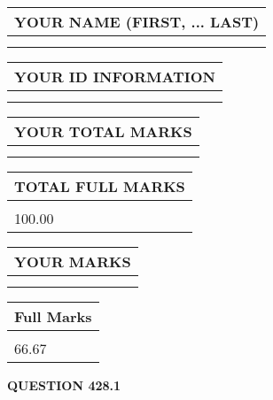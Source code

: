 \documentclass{ctexart}
\begin{document}
   
   
   
\newpage 
\setcounter{page}{ 
   428001 } 
   
   
   
   
\noindent\begin{tabular}{|l|}
\hline
YOUR NAME (FIRST, ... LAST)  \\
\hline
 \\ 
 \\ 
\hline
\end{tabular}
\hspace{0.05in} \begin{tabular}{|l|}
\hline
 YOUR   ID   INFORMATION  \\
\hline
 \\ 
 \\ 
\hline
\end{tabular}
   
   
\vspace{0.2in}\noindent\begin{tabular}{|l|}
\hline
YOUR TOTAL MARKS  \\
\hline
 \\ 
 \\ 
\hline
\end{tabular}
\hspace{0.05in} \begin{tabular}{|l|}
\hline
TOTAL FULL MARKS  \\
\hline
 \\ 
100.00 \\
\hline
\end{tabular}
   
   
 \vspace{0.2in}
 
 
 
 
   
   
  
\vspace{0.2in}
  
\noindent\begin{tabular}{|l|}
\hline
 YOUR MARKS  \\
\hline
 \\ 
 \\ 
\hline
\end{tabular}
\hspace{0.05in} \begin{tabular}{|l|}
\hline
 Full Marks  \\
\hline
 \\ 
66.67 \\
\hline
\end{tabular}
{\textbf{\Large{QUESTION
428.1 
}}}
  
\end{document}
